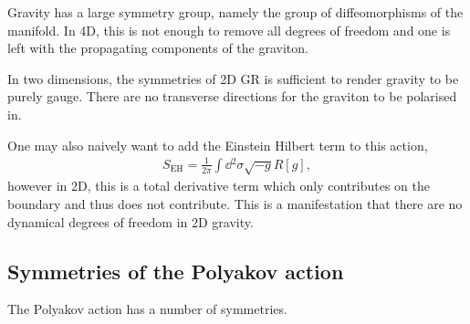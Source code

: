 Gravity has a large symmetry group, namely the group of diffeomorphisms of the manifold. In 4D, this is not enough to remove all degrees of freedom and one is left with the propagating components of the graviton. 

In two dimensions, the symmetries of 2D GR is sufficient to render gravity to be purely gauge. There are no transverse directions for the graviton to be polarised in.

One may also naively want to add the Einstein Hilbert term to this action,
\begin{align}
    S_\text{EH} = \frac{1}{2\pi} \int \dd{^2\sigma} \sqrt{-g}  R \left[ g \right] 
,\end{align}
however in 2D, this is a total derivative term which only contributes on the boundary and thus does not contribute. This is a manifestation that there are no dynamical degrees of freedom in 2D gravity.

\subsection{Symmetries of the Polyakov action}
The Polyakov action has a number of symmetries.

